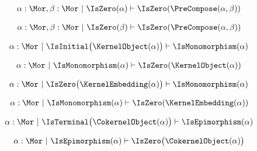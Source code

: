 \begin{sequent}
\begin{align*}
   \alpha: \Mor, \beta: \Mor ~|~ \IsZero(\alpha) \vdash \IsZero(\PreCompose(\alpha,\beta))
\end{align*}
\end{sequent}

\begin{sequent}
\begin{align*}
   \alpha: \Mor, \beta: \Mor ~|~ \IsZero(\beta) \vdash \IsZero(\PreCompose(\alpha,\beta))
\end{align*}
\end{sequent}

\begin{sequent}
\begin{align*}
  \alpha: \Mor ~|~ \IsInitial\big( \KernelObject( \alpha ) \big) \vdash \IsMonomorphism( \alpha )
\end{align*}
\end{sequent}

\begin{sequent}
\begin{align*}
  \alpha: \Mor ~|~ \IsMonomorphism( \alpha ) \vdash \IsZero( \KernelObject( \alpha ) )
\end{align*}
\end{sequent}

\begin{sequent}
\begin{align*}
  \alpha: \Mor ~|~ \IsZero\big( \KernelEmbedding( \alpha ) \big) \vdash \IsMonomorphism( \alpha )
\end{align*}
\end{sequent}

\begin{sequent}
\begin{align*}
  \alpha: \Mor ~|~ \IsMonomorphism( \alpha ) \vdash \IsZero( \KernelEmbedding( \alpha ) )
\end{align*}
\end{sequent}

\begin{sequent}
\begin{align*}
  \alpha: \Mor ~|~ \IsTerminal\big( \CokernelObject( \alpha ) \big) \vdash \IsEpimorphism( \alpha )
\end{align*}
\end{sequent}

\begin{sequent}
\begin{align*}
  \alpha: \Mor ~|~ \IsEpimorphism( \alpha ) \vdash \IsZero\big( \CokernelObject( \alpha ) \big)
\end{align*}
\end{sequent}

